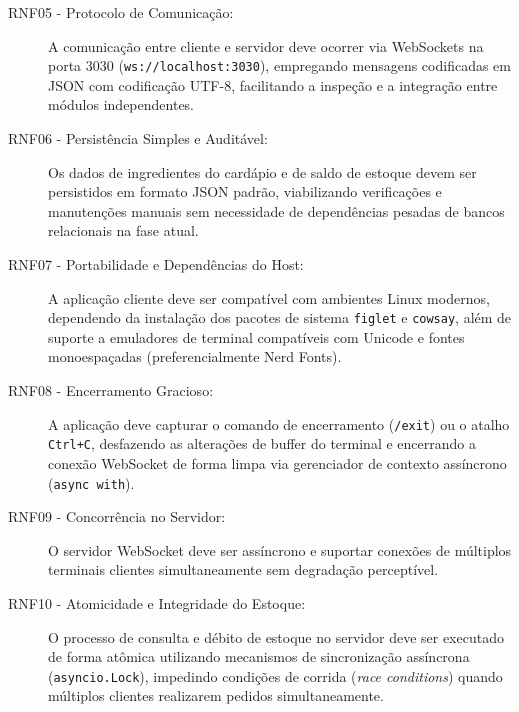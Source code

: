 \documentclass[12pt]{article}
\begin{document}
\begin{description}
    \item[RNF05 - Protocolo de Comunicação:] A comunicação entre cliente e servidor deve ocorrer via WebSockets na porta 3030 (\texttt{ws://localhost:3030}), empregando mensagens codificadas em JSON com codificação UTF-8, facilitando a inspeção e a integração entre módulos independentes.

    \item[RNF06 - Persistência Simples e Auditável:] Os dados de ingredientes do cardápio e de saldo de estoque devem ser persistidos em formato JSON padrão, viabilizando verificações e manutenções manuais sem necessidade de dependências pesadas de bancos relacionais na fase atual.

    \item[RNF07 - Portabilidade e Dependências do Host:] A aplicação cliente deve ser compatível com ambientes Linux modernos, dependendo da instalação dos pacotes de sistema \texttt{figlet} e \texttt{cowsay}, além de suporte a emuladores de terminal compatíveis com Unicode e fontes monoespaçadas (preferencialmente Nerd Fonts).

    \item[RNF08 - Encerramento Gracioso:] A aplicação deve capturar o comando de encerramento (\texttt{/exit}) ou o atalho \texttt{Ctrl+C}, desfazendo as alterações de buffer do terminal e encerrando a conexão WebSocket de forma limpa via gerenciador de contexto assíncrono (\texttt{async with}).

    \item[RNF09 - Concorrência no Servidor:] O servidor WebSocket deve ser assíncrono e suportar conexões de múltiplos terminais clientes simultaneamente sem degradação perceptível.

    \item[RNF10 - Atomicidade e Integridade do Estoque:] O processo de consulta e débito de estoque no servidor deve ser executado de forma atômica utilizando mecanismos de sincronização assíncrona (\texttt{asyncio.Lock}), impedindo condições de corrida (\textit{race conditions}) quando múltiplos clientes realizarem pedidos simultaneamente.
\end{description}
\end{document}
